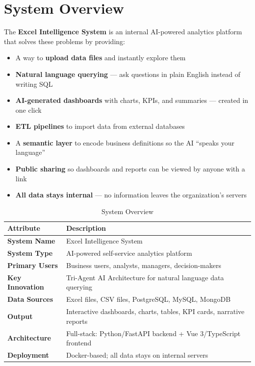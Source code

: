 \documentclass[12pt,a4paper]{report}
\begin{document}
\section{System Overview}

The \textbf{Excel Intelligence System} is an internal AI-powered analytics platform that solves these problems by providing:

\begin{itemize}[leftmargin=1.5cm]
    \item A way to \textbf{upload data files} and instantly explore them
    \item \textbf{Natural language querying} --- ask questions in plain English instead of writing SQL
    \item \textbf{AI-generated dashboards} with charts, KPIs, and summaries --- created in one click
    \item \textbf{ETL pipelines} to import data from external databases
    \item A \textbf{semantic layer} to encode business definitions so the AI ``speaks your language''
    \item \textbf{Public sharing} so dashboards and reports can be viewed by anyone with a link
    \item \textbf{All data stays internal} --- no information leaves the organization's servers
\end{itemize}

\begin{table}[H]
\centering
\caption{System Overview}
\begin{tabular}{>{\bfseries}p{4cm} p{9cm}}
\toprule
\textbf{Attribute} & \textbf{Description} \\
\midrule
System Name & Excel Intelligence System \\
System Type & AI-powered self-service analytics platform \\
Primary Users & Business users, analysts, managers, decision-makers \\
Key Innovation & Tri-Agent AI Architecture for natural language data querying \\
Data Sources & Excel files, CSV files, PostgreSQL, MySQL, MongoDB \\
Output & Interactive dashboards, charts, tables, KPI cards, narrative reports \\
Architecture & Full-stack: Python/FastAPI backend + Vue 3/TypeScript frontend \\
Deployment & Docker-based; all data stays on internal servers \\
\bottomrule
\end{tabular}
\label{tab:sysoverview}
\end{table}
\end{document}
